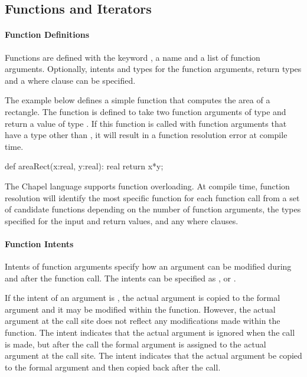\subsection{Functions and Iterators}
\paragraph{Function Definitions}

Functions are defined with the keyword , a name and a list
of function arguments.  Optionally, intents and types for the function
arguments, return types and a where clause can be specified.

\begin{example}
The example below defines a simple function that computes the area of
a rectangle.  The  function is defined to take two
function arguments of type  and return a value of
type .  If this function is called with function arguments
that have a type other than , it will result in a function
resolution error at compile time.
\begin{chapel}
def areaRect(x:real, y:real): real {
  return x*y;
}
\end{chapel}
\end{example}

The Chapel language supports function overloading.  At compile time,
function resolution will identify the most specific function for each
function call from a set of candidate functions depending on the
number of function arguments, the types specified for the input and
return values, and any where clauses.

\paragraph{Function Intents}
Intents of function arguments specify how an argument can be
modified during and after the function call. 
The intents can be specified as ,  or .

If the intent of an argument is , the actual argument is copied 
to the formal argument and it may be modified within the function.  However, 
the actual argument at the call site does not reflect any modifications 
made within the function.  The  intent indicates that the 
actual argument is ignored when the call is made, but after the
call the formal argument is assigned to the actual argument at the call site.
The  intent indicates that the actual argument be copied to 
the formal argument and then copied back after the call.

